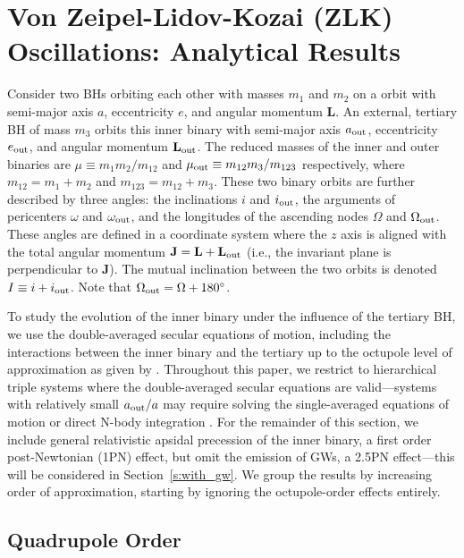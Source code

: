 \documentclass[
        fleqn,
        usenatbib,
    ]{mnras}
\newcommand*{\bm}[1]{\mathbf{#1}}
\begin{document}
\section{Von Zeipel-Lidov-Kozai (ZLK) Oscillations: Analytical
Results}\label{s:background}

Consider two BHs orbiting each other with masses $m_1$ and $m_2$ on a orbit with
semi-major axis $a$, eccentricity $e$, and angular momentum $\bm{L}$. An external,
tertiary BH of mass $m_3$ orbits this inner binary with semi-major axis $a_{\rm
out}$, eccentricity $e_{\rm out}$, and angular momentum $\bm{L}_{\rm out}$. The
reduced masses of the inner and outer binaries are $\mu \equiv m_1m_2 / m_{12}$
and $\mu_{\rm out} \equiv m_{12} m_3 / m_{123}$ respectively, where $m_{12} =
m_1 + m_2$ and $m_{123} = m_{12} + m_3$. These two binary orbits are further
described by three angles: the inclinations $i$ and $i_{\rm out}$, the arguments
of pericenters $\omega$ and $\omega_{\rm out}$, and the longitudes of the
ascending nodes $\Omega$ and $\Omega_{\rm out}$. These angles are defined in a
coordinate system where the $z$ axis is aligned with the total angular momentum
$\bm{J} = \bm{L} + \bm{L}_{\rm out}$ (i.e., the invariant plane is perpendicular
to $\bm{J}$). The mutual inclination between the two orbits is denoted $I \equiv
i + i_{\rm out}$. Note that $\Omega_{\rm out} = \Omega + 180^\circ$.

To study the evolution of the inner binary under the influence of the tertiary
BH, we use the double-averaged secular equations of motion, including the
interactions between the inner binary and the tertiary up to the octupole level
of approximation as given by \citet{LML15}. Throughout this paper, we restrict
to hierarchical triple systems where the double-averaged secular equations are
valid---systems with relatively small $a_{\rm out}/a$ may require solving the
single-averaged equations of motion or direct N-body integration
\citep[see][]{LL19}. For the remainder of this section, we include general
relativistic apsidal precession of the inner binary, a first order
post-Newtonian (1PN) effect, but omit the emission of GWs, a 2.5PN effect---this
will be considered in Section~\ref{s:with_gw}. We group the results by
increasing order of approximation, starting by ignoring the octupole-order
effects entirely.

\subsection{Quadrupole Order}
\end{document}
